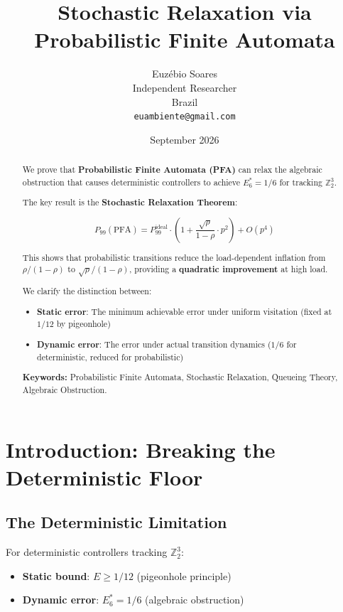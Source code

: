 \documentclass[11pt]{article}
\title{Stochastic Relaxation via Probabilistic Finite Automata}
\author{Euz\'{e}bio Soares \\
Independent Researcher \\
Brazil \\
\texttt{euambiente@gmail.com}}
\date{September 2026}
\begin{document}
\maketitle

\begin{abstract}
We prove that \textbf{Probabilistic Finite Automata (PFA)} can relax the algebraic obstruction that causes deterministic controllers to achieve $E_6^* = 1/6$ for tracking $\mathbb{Z}_2^3$.

The key result is the \textbf{Stochastic Relaxation Theorem}:

$$P_{99}(\text{PFA}) = P_{99}^{\text{ideal}} \cdot \left(1 + \frac{\sqrt{\rho}}{1-\rho} \cdot p^2\right) + O(p^4)$$

This shows that probabilistic transitions reduce the load-dependent inflation from $\rho/(1-\rho)$ to $\sqrt{\rho}/(1-\rho)$, providing a \textbf{quadratic improvement} at high load.

We clarify the distinction between:
\begin{itemize}
    \item \textbf{Static error}: The minimum achievable error under uniform visitation (fixed at $1/12$ by pigeonhole)
    \item \textbf{Dynamic error}: The error under actual transition dynamics ($1/6$ for deterministic, reduced for probabilistic)
\end{itemize}

\textbf{Keywords:} Probabilistic Finite Automata, Stochastic Relaxation, Queueing Theory, Algebraic Obstruction.
\end{abstract}

\section{Introduction: Breaking the Deterministic Floor}

\subsection{The Deterministic Limitation}

For deterministic controllers tracking $\mathbb{Z}_2^3$:
\begin{itemize}
    \item \textbf{Static bound}: $E \geq 1/12$ (pigeonhole principle)
    \item \textbf{Dynamic error}: $E_6^* = 1/6$ (algebraic obstruction)
\end{itemize}
\end{document}
